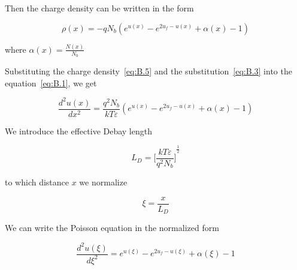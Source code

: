 Then the charge density can be written in the form

\begin{equation}\label{eq:B.5}
  \rho(x) = -qN_b(e^{u(x)} - e^{2u_f-u(x)} + \alpha(x) - 1)
\end{equation}

where $\alpha(x) = \frac{N(x)}{N_b}$

Substituting the charge density~\ref{eq:B.5} and the
substitution~\ref{eq:B.3} into the equation~\ref{eq:B.1}, we get

\begin{equation}\label{eq:B.6}
  \frac{d^{2}u(x)}{dx^2} = \frac{q^2N_b}{kT\varepsilon}(e^{u(x)} - e^{2u_f-u(x)} + \alpha(x) - 1)
\end{equation}

We introduce the effective Debay length

\begin{equation}\label{eq:B.7}
  L_D = {\Bigg[\frac{kT\varepsilon}{q^{2}N_b}\Bigg]}^{\frac{1}{2}}
\end{equation}

to which distance $x$ we normalize

\begin{equation}\label{eq:B.8}
  \xi = \frac{x}{L_D}
\end{equation}

We can write the Poisson equation in the normalized form

\begin{equation}\label{eq:B.9}
  \frac{d^{2}u(\xi)}{d\xi^2} = e^{u(\xi)} - e^{2u_f-u(\xi)} + \alpha(\xi) - 1
\end{equation}
